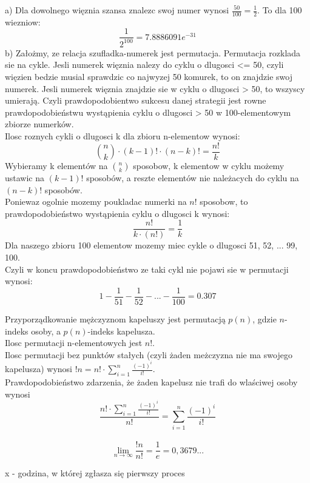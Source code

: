\documentclass[fleqn]{article}
\begin{document}
a) Dla dowolnego więznia szansa znalezc swoj numer wynosi $\frac{50}{100} = \frac{1}{2}$. To dla 100 wiezniow: \\
\[\frac{1}{2^{100}} = 7.8886091e^{-31}\]
b) Założmy, ze relacja szufladka-numerek jest permutacja. Permutacja rozklada sie na cykle. Jesli numerek więznia nalezy do cyklu o dlugosci <= 50, czyli więzien bedzie musial sprawdzic co najwyzej 50 komurek, to on znajdzie swoj numerek. Jesli numerek więznia znajdzie sie w cyklu o dlugosci > 50, to wszyscy umierają. Czyli prawdopodobientwo sukcesu danej strategii jest rowne prawdopodobieństwu wystąpienia cyklu o dlugosci > 50 w 100-elementowym zbiorze numerków.\\
Ilosc roznych cykli o dlugosci k dla zbioru n-elementow wynosi:\\
\[{n \choose k}\cdot(k-1)!\cdot(n-k)! = \frac{n!}{k}\]
Wybieramy k elementów na ${n \choose k}$ sposobow, k elementow w cyklu możemy ustawic na $(k-1)!$ sposobów, a reszte elementów nie należacych do cyklu na $(n-k)!$ sposobów.\\
Poniewaz ogolnie mozemy poukladac numerki na $n!$ sposobow, to prawdopodobieństwo wystąpienia cyklu o dlugosci k wynosi:
\[\frac{n!}{k\cdot(n!)} = \frac{1}{k}\]
Dla naszego zbioru 100 elementow mozemy miec cykle o dlugosci 51, 52, ... 99, 100.\\
Czyli w koncu prawdopodobieństwo ze taki cykl nie pojawi sie w permutacji wynosi:
\[1 - \frac{1}{51} - \frac{1}{52} - ... - \frac{1}{100} = 0.307\]

\medskip

\medskip

Przyporządkowanie mężczyznom kapeluszy jest permutacją $p(n)$, gdzie $n$-indeks osoby, a $p(n)$-indeks kapelusza. \\
Ilosc permutacji n-elementowych jest $n!$. \\
Ilosc permutacji bez punktów stałych (czyli żaden meżczyzna nie ma swojego kapelusza) wynosi ${!n} = {n!}\cdot\sum_{i=1}^{n} \frac{(-1)^{i}}{i!}$. \\
Prawdopodobieństwo zdarzenia, że żaden kapelusz nie trafi do wlaściwej osoby wynosi
\[\frac{{n!}\cdot\sum_{i=1}^{n} \frac{(-1)^{i}}{i!}}{n!} = \sum_{i=1}^{n} \frac{(-1)^{i}}{i!}\]
\\
\[\lim_{n\to\infty} \frac{!n}{n!} = \frac{1}{e} = 0,3679...\]

\medskip
{}
\medskip

x - godzina, w której zgłasza się pierwszy proces
\end{document}
